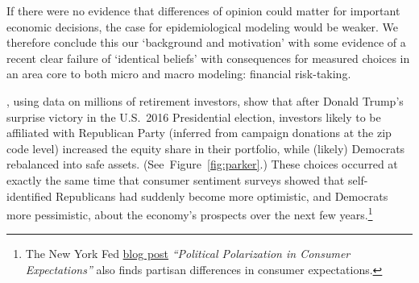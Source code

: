 If there were no evidence that differences of opinion could matter for important economic decisions, the case for epidemiological modeling would be weaker.  We therefore conclude this our `background and motivation' with some evidence of a recent clear failure of `identical beliefs' with consequences for measured choices in an area core to both micro and macro modeling: financial risk-taking.

, using data on millions of retirement investors, show that after Donald Trump's surprise victory in the U.S.\ 2016 Presidential election, investors likely to be affiliated with Republican Party (inferred from  campaign donations at the zip code level) increased the equity share in their portfolio, while (likely) Democrats rebalanced into safe assets. (See~Figure~\ref{fig:parker}.)  These choices occurred at exactly the same time that consumer sentiment surveys showed that self-identified Republicans had suddenly become more optimistic, and Democrats more pessimistic, about the economy's prospects over the next few years.\footnote{The New York Fed \href{https://libertystreeteconomics.newyorkfed.org/2017/12/political-polarization-in-consumer-expectation'}{blog post} \textit{``Political Polarization in Consumer Expectations''} also finds partisan differences in consumer expectations.}



